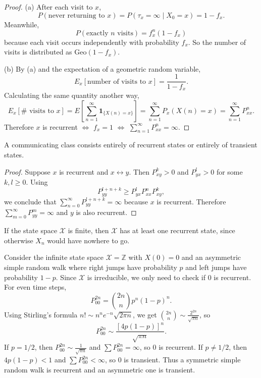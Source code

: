 \documentclass{ximera}
\begin{document}
\begin{proof}
(a) After each visit to $x$,
\[
P(\text{never returning to } x) = P(\tau_x = \infty \mid X_0 = x) = 1 - f_x.
\]
Meanwhile,
\[
P(\text{exactly } n \text{ visits}) = f_x^n(1 - f_x)
\]
because each visit occurs independently with probability $f_x$. So the number of visits is distributed as $\text{Geo}(1 - f_x)$.

(b) By (a) and the expectation of a geometric random variable,
\[
E_x[\text{number of visits to } x] = \frac{1}{1 - f_x}.
\]
Calculating the same quantity another way,
\[
E_x[\#\text{ visits to } x] = E\left[\sum_{n=1}^{\infty} \mathbf{1}_{\{X(n)=x\}}\right] = \sum_{n=1}^{\infty} P_x(X(n) = x) = \sum_{n=1}^{\infty} P^n_{xx}.
\]
Therefore $x$ is recurrent $\iff$ $f_x = 1$ $\iff$ $\displaystyle\sum_{n=1}^{\infty} P^n_{xx} = \infty$.
\end{proof}

\begin{theorem}
A communicating class consists entirely of recurrent states or entirely of transient states.
\end{theorem}

\begin{proof}
Suppose $x$ is recurrent and $x \leftrightarrow y$. Then $P^k_{xy} > 0$ and $P^l_{yx} > 0$ for some $k, l \geq 0$. Using
\[
P^{l+n+k}_{yy} \geq P^l_{yx} P^n_{xx} P^k_{xy},
\]
we conclude that $\displaystyle\sum_{n=0}^{\infty} P^{l+n+k}_{yy} = \infty$ because $x$ is recurrent. Therefore $\displaystyle\sum_{m=0}^{\infty} P^m_{yy} = \infty$ and $y$ is also recurrent.
\end{proof}

\begin{remark}
If the state space $\mathcal{X}$ is finite, then $\mathcal{X}$ has at least one recurrent state, since otherwise $X_n$ would have nowhere to go.
\end{remark}

\begin{example}
Consider the infinite state space $\mathcal{X} = \mathbb{Z}$ with $X(0) = 0$ and an asymmetric simple random walk where right jumps have probability $p$ and left jumps have probability $1-p$. Since $\mathcal{X}$ is irreducible, we only need to check if $0$ is recurrent. For even time steps,
\[
P^{2n}_{00} = \binom{2n}{n} p^n(1-p)^n.
\]
Using Stirling's formula $n! \sim n^n e^{-n} \sqrt{2\pi n}$, we get $\binom{2n}{n} \sim \frac{2^{2n}}{\sqrt{\pi n}}$, so
\[
P^{2n}_{00} \sim \frac{[4p(1-p)]^n}{\sqrt{\pi n}}.
\]
If $p = 1/2$, then $P^{2n}_{00} \sim \frac{1}{\sqrt{\pi n}}$ and $\sum P^{2n}_{00} = \infty$, so $0$ is recurrent. If $p \neq 1/2$, then $4p(1-p) < 1$ and $\sum P^{2n}_{00} < \infty$, so $0$ is transient. Thus a symmetric simple random walk is recurrent and an asymmetric one is transient.
\end{example}
\end{document}
